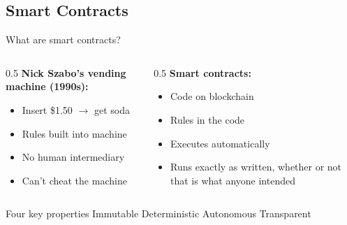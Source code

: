 \ifdefined\PRESENTATION\else\PassOptionsToClass{handout}{beamer}\fi\documentclass[aspectratio=169, lualatex]{beamer}
\begin{document}
\subsection{Smart Contracts}

\begin{frame}{What are smart contracts?}
	\begin{columns}[c]
		\begin{column}{0.5\textwidth}
			\textbf{Nick Szabo's vending machine (1990s):}
			\begin{itemize}
				\item Insert \$1.50 $\rightarrow$ get soda
				\item Rules built into machine
				\item No human intermediary
				\item Can't cheat the machine
			\end{itemize}
		\end{column}
		\begin{column}{0.5\textwidth}
			\textbf{Smart contracts:}
			\begin{itemize}
				\item Code on blockchain
				\item Rules in the code
				\item Executes automatically
				\item Runs exactly as written, whether or not that is what anyone intended
			\end{itemize}
		\end{column}
	\end{columns}
	\begin{exampleblock}{Four key properties}
		Immutable \textbullet{} Deterministic \textbullet{} Autonomous \textbullet{} Transparent
	\end{exampleblock}
\end{frame}
\end{document}

